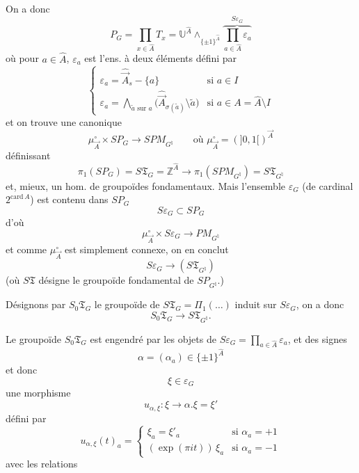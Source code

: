 \documentclass[11pt,a4paper]{article}
\begin{document}
On a donc
\[
P_G = \prod_{x \in \hat{A}} T_x
= \mathbb{U}^{\hat{A}} \wedge_{\{\pm 1\}^{\hat{A}}}
\overbrace{\prod_{a \in \hat{A}} \varepsilon_a}^{S\varepsilon_G}
\]
où pour $a \in \hat{A}$, $\varepsilon_a$ est l'ens. à deux éléments défini par
\[
\begin{cases}
\varepsilon_a = \hat{\vec{A}}_s - \{a\} & \text{si } a \in I \\
\varepsilon_a = \bigwedge_{\tilde{a} \text{ sur } a} \bigl( \hat{\vec{A}}_{\sigma(\tilde{a})} \setminus \tilde{a} \bigr) & \text{si } a \in A = \hat{A} \setminus I
\end{cases}
\]
et on trouve une \struck{\ill{}}  canonique
\[
\mu^{\circ}_{\vec{A}} \times SP_G \longrightarrow SPM_{G^{\natural}}
\qquad \text{où } \mu^{\circ}_{\vec{A}} = (]0,1[)^{\vec{A}}
\]
définissant
\[
\pi_1(SP_G) = S\mathfrak{T}_G = \mathbb{Z}^{\hat{A}} \longrightarrow
\pi_1(SPM_{G^{\natural}}) = S\mathfrak{T}_{G^{\natural}}
\]
et, mieux, un hom. de groupoïdes fondamentaux. Mais
 l'ensemble
$\varepsilon_G$ (de cardinal $2^{\mathrm{card}\, A}$) est contenu dans $SP_G$
\[
S\varepsilon_G \subset SP_G
\]
d'où
\[
\mu^{\circ}_{\vec{A}} \times S\varepsilon_G \longrightarrow PM_{G^{\natural}}
\]
et comme $\mu^{\circ}_{\vec{A}}$ est simplement connexe, on en conclut
\[
S\varepsilon_G \longrightarrow (S\mathfrak{T}_{G^{\natural}})
\]
(où $S\mathfrak{T}$ désigne le groupoïde fondamental de $SP_{G^{\natural}}$.)

 Désignons par $S_0\mathfrak{T}_G$ le
groupoïde de $S\mathfrak{T}_G = \Pi_1(\ldots)$ induit sur
$S\varepsilon_G$, on a donc
\[
S_0\mathfrak{T}_G \longrightarrow S\mathfrak{T}_{G^{\natural}} .
\]

Le groupoïde $S_0\mathfrak{T}_G$ est engendré par les objets de
$S\varepsilon_G = \prod_{a \in \hat{A}} \varepsilon_a$, et  des signes \add{$\varepsilon$}
\[
\alpha = (\alpha_a) \in \{\pm 1\}^{\hat{A}}
\]
et donc
\[
\xi \in \varepsilon_G
\]
une morphisme
\[
u_{\alpha,\xi} : \xi \longrightarrow \alpha.\xi = \xi'
\]
\struck{\ill{}}  défini par
\[
u_{\alpha,\xi}(t)_a =
\begin{cases}
\xi_a = \xi'_a & \text{si } \alpha_a = +1 \\
(\exp(\pi i t))\, \xi_a & \text{si } \alpha_a = -1
\end{cases}
\]
avec les relations
\end{document}
